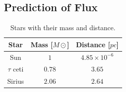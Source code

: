 \subsection{Prediction of Flux}

\begin{table}[H]
    \centering
	\caption{Stars with their mass and distance.}
	\label{tab:stars and mass}
	\begin{tabular}{ccc}
		\toprule
		Star & Mass [$M\odot$]  & Distance [$pc$] \\
		\midrule
		Sun & $1$ & $4.85\times 10^{-6}$\\
		$\tau$ ceti & $0.78$ & $3.65$\\
		Sirius & $2.06$ & $2.64 $\\
		\bottomrule
	\end{tabular}
\end{table}
